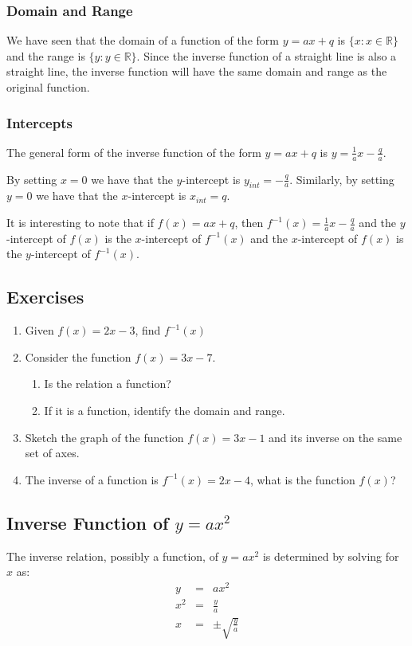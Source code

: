 \subsubsection{Domain and Range}
We have seen that the domain of a function of the form $y=ax+q$ is $\{x:x\in\mathbb{R}\}$ and the range is $\{y:y\in\mathbb{R}\}$. Since the inverse function of a straight line is also a straight line, the inverse function will have the same domain and range as the original function.

\subsubsection{Intercepts}
The general form of the inverse function of the form $y=ax+q$ is $y=\frac{1}{a}x-\frac{q}{a}$.

By setting $x=0$ we have that the $y$-intercept is $y_{int}=-\frac{q}{a}$. Similarly, by setting $y=0$ we have that the $x$-intercept is $x_{int}=q$.

It is interesting to note that if $f(x)=ax+q$, then $f^{-1}(x)=\frac{1}{a}x-\frac{q}{a}$ and the $y$-intercept of $f(x)$ is the $x$-intercept of $f^{-1}(x)$ and the $x$-intercept of $f(x)$ is the $y$-intercept of $f^{-1}(x)$.

\subsection{Exercises}
\begin{enumerate}
\item{Given $f(x)=2x-3$, find $f^{-1}(x)$}
\item{Consider the function $f(x) = 3x - 7$.
\begin{enumerate}
\item{Is the relation a function?}
\item{If it is a function, identify the domain and range.}
\end{enumerate}}
\item{Sketch the graph of the function $f(x)= 3x - 1$ and its inverse on the same set of axes.}
\item{The inverse of a function is $f^{-1}(x)= 2x - 4$, what is the function $f(x)$?}
\end{enumerate}

\subsection{Inverse Function of $y=ax^2$}
The inverse relation, possibly a function, of $y=ax^2$ is determined by solving for $x$ as:
\begin{eqnarray}
y&=&ax^2\\
x^2&=&\frac{y}{a}\\
x&=&\pm\sqrt{\frac{y}{a}}
\end{eqnarray}

